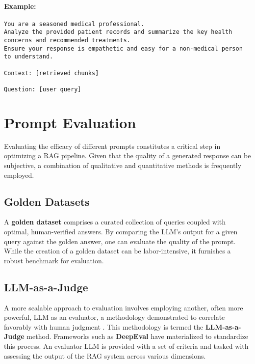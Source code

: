 \paragraph{Example:}
\begin{verbatim}
You are a seasoned medical professional.
Analyze the provided patient records and summarize the key health concerns and recommended treatments.
Ensure your response is empathetic and easy for a non-medical person to understand.

Context: [retrieved chunks]

Question: [user query]
\end{verbatim}

\section{Prompt Evaluation}
Evaluating the efficacy of different prompts constitutes a critical step in optimizing a RAG pipeline. Given that the quality of a generated response can be subjective, a combination of qualitative and quantitative methods is frequently employed.

\subsection{Golden Datasets}
A \textbf{golden dataset} comprises a curated collection of queries coupled with optimal, human-verified answers. By comparing the LLM's output for a given query against the golden answer, one can evaluate the quality of the prompt. While the creation of a golden dataset can be labor-intensive, it furnishes a robust benchmark for evaluation.

\subsection{LLM-as-a-Judge}
A more scalable approach to evaluation involves employing another, often more powerful, LLM as an evaluator, a methodology demonstrated to correlate favorably with human judgment \autocite{zheng2023judging}. This methodology is termed the \textbf{LLM-as-a-Judge} method. Frameworks such as \textbf{DeepEval} have materialized to standardize this process. An evaluator LLM is provided with a set of criteria and tasked with assessing the output of the RAG system across various dimensions.

